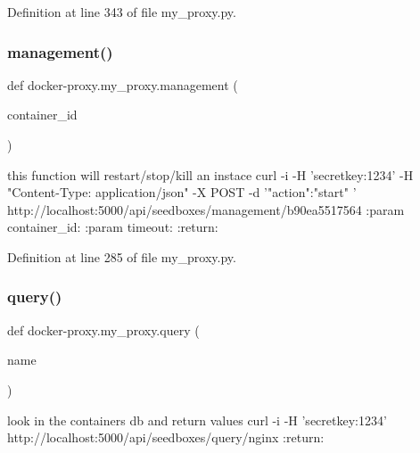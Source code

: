 Definition at line 343 of file my\+\_\+proxy.\+py.

\hypertarget{namespacedocker-proxy_1_1my__proxy_a96423469e4fe05cd336a8af7cb28d2ba}{}\label{namespacedocker-proxy_1_1my__proxy_a96423469e4fe05cd336a8af7cb28d2ba} 
\subsubsection{\texorpdfstring{management()}{management()}}
{\footnotesize\ttfamily def docker-\/proxy.\+my\+\_\+proxy.\+management (\begin{DoxyParamCaption}\item[{}]{container\+\_\+id }\end{DoxyParamCaption})}

\begin{DoxyVerb}this function will restart/stop/kill an instace
curl -i -H 'secretkey:1234' -H "Content-Type: application/json" -X POST -d
'{"action":"start" }' http://localhost:5000/api/seedboxes/management/b90ea5517564
:param container_id:
:param timeout:
:return:
\end{DoxyVerb}
 

Definition at line 285 of file my\+\_\+proxy.\+py.

\hypertarget{namespacedocker-proxy_1_1my__proxy_a7f6173c933a3e2e679eedb795386a08e}{}\label{namespacedocker-proxy_1_1my__proxy_a7f6173c933a3e2e679eedb795386a08e} 
\subsubsection{\texorpdfstring{query()}{query()}}
{\footnotesize\ttfamily def docker-\/proxy.\+my\+\_\+proxy.\+query (\begin{DoxyParamCaption}\item[{}]{name }\end{DoxyParamCaption})}

\begin{DoxyVerb}look in the containers db and return values
curl -i -H 'secretkey:1234'  http://localhost:5000/api/seedboxes/query/nginx
:return:
\end{DoxyVerb}
 

